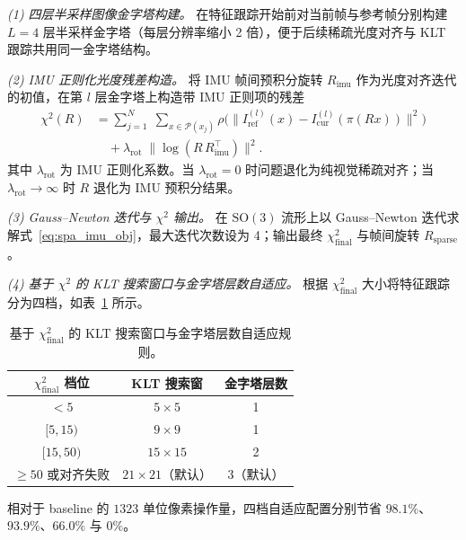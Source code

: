 \documentclass[letterpaper,journal]{IEEEtran}
\begin{document}
\textit{(1) 四层半采样图像金字塔构建。} 在特征跟踪开始前对当前帧与参考帧分别构建 $L=4$ 层半采样金字塔（每层分辨率缩小 2 倍），便于后续稀疏光度对齐与 KLT 跟踪共用同一金字塔结构。

\textit{(2) IMU 正则化光度残差构造。} 将 IMU 帧间预积分旋转 $R_{\mathrm{imu}}$ 作为光度对齐迭代的初值，在第 $l$ 层金字塔上构造带 IMU 正则项的残差
\begin{equation}
\begin{aligned}
\chi^2(R) &=
  \sum_{j=1}^{N}\;\sum_{x\in\mathcal{P}(x_j)}
    \rho\!\Big( \big\|I_{\mathrm{ref}}^{(l)}(x)-I_{\mathrm{cur}}^{(l)}(\pi(Rx))\big\|^2 \Big) \\[2pt]
  &\quad + \lambda_{\mathrm{rot}}\;\|\log(R\,R_{\mathrm{imu}}^{\!\top})\|^2 .
\end{aligned}
\label{eq:spa_imu_obj}
\end{equation}
其中 $\lambda_{\mathrm{rot}}$ 为 IMU 正则化系数。当 $\lambda_{\mathrm{rot}}=0$ 时问题退化为纯视觉稀疏对齐；当 $\lambda_{\mathrm{rot}}\to\infty$ 时 $R$ 退化为 IMU 预积分结果。

\textit{(3) Gauss--Newton 迭代与 $\chi^2$ 输出。} 在 $\mathrm{SO}(3)$ 流形上以 Gauss--Newton 迭代求解式~\eqref{eq:spa_imu_obj}，最大迭代次数设为 4；输出最终 $\chi^2_{\mathrm{final}}$ 与帧间旋转 $R_{\mathrm{sparse}}$。

\textit{(4) 基于 $\chi^2$ 的 KLT 搜索窗口与金字塔层数自适应。} 根据 $\chi^2_{\mathrm{final}}$ 大小将特征跟踪分为四档，如表~\ref{tab:chi2} 所示。

\begin{table}[!t]
\centering
\caption{基于 $\chi^2_{\mathrm{final}}$ 的 KLT 搜索窗口与金字塔层数自适应规则。}
\label{tab:chi2}
\begin{tabular}{|c|c|c|}
\hline
$\chi^2_{\mathrm{final}}$ 档位 & KLT 搜索窗 & 金字塔层数 \\
\hline
$< 5$                              & $5\times5$  & 1 \\
\hline
$[5, 15)$                          & $9\times9$  & 1 \\
\hline
$[15, 50)$                         & $15\times15$ & 2 \\
\hline
$\ge 50$ 或对齐失败                & $21\times21$（默认） & 3（默认） \\
\hline
\end{tabular}
\end{table}

相对于 baseline 的 $1323$ 单位像素操作量，四档自适应配置分别节省 $98.1\%$、$93.9\%$、$66.0\%$ 与 $0\%$。
\end{document}

